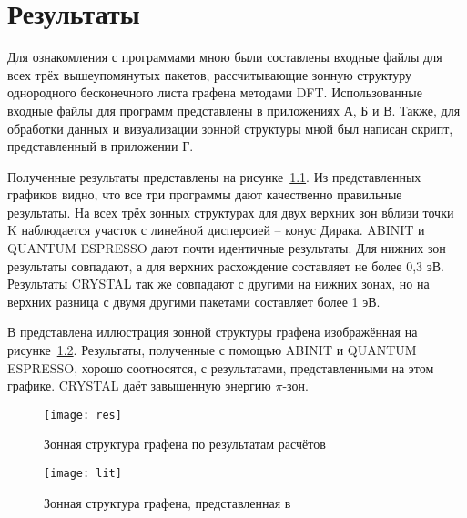 \chapter{Результаты}
 
 Для ознакомления с программами мною были составлены входные файлы для всех трёх вышеупомянутых пакетов, рассчитывающие зонную структуру однородного бесконечного листа графена методами DFT. Использованные входные файлы для программ представлены в приложениях А, Б и В. Также, для обработки данных и визуализации зонной структуры мной был написан скрипт, представленный в приложении Г.

 Полученные результаты представлены на рисунке~\ref{res}.
 Из представленных графиков видно, что все три программы дают качественно правильные результаты. На всех трёх зонных структурах для двух верхних зон вблизи точки K наблюдается участок с линейной дисперсией -- конус Дирака. ABINIT и QUANTUM ESPRESSO дают почти идентичные результаты. Для нижних зон результаты совпадают, а для верхних расхождение составляет не более 0,3 эВ. Результаты CRYSTAL так же совпадают с другими на нижних зонах, но на верхних разница с двумя другими пакетами составляет более 1 эВ.

 В \cite{graphene} представлена иллюстрация зонной структуры графена изображённая на рисунке~\ref{lit}. Результаты, полученные с помощью ABINIT и QUANTUM ESPRESSO, хорошо соотносятся, с результатами, представленными на этом графике. CRYSTAL даёт завышенную энергию \( \pi \)-зон.

 \begin{figure}[h!]
    \center
    \texttt{[image: res]}
    \caption{Зонная структура графена по результатам расчётов}
    \label{res}
\end{figure}
\vspace*{4cm}
\begin{figure}[h!]
    \center
    \texttt{[image: lit]}
    \caption{Зонная структура графена, представленная в \cite{graphene}}
    \label{lit}
\end{figure}
\clearpage